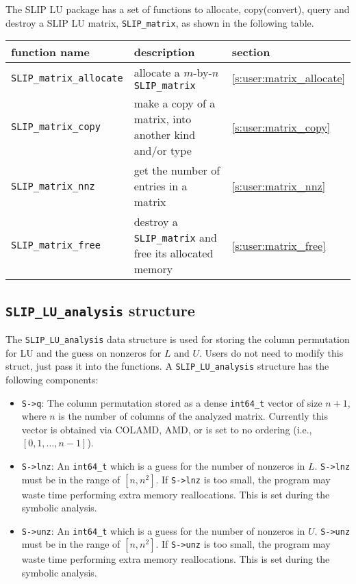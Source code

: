 \documentclass[12pt]{article}
\theoremstyle{definition}
\begin{document}
The SLIP LU package has a set of functions to allocate, copy(convert), query and
destroy a SLIP LU matrix, \verb|SLIP_matrix|, as shown in the following table.

{\small
\begin{center}
\begin{tabular}{lp{2.5in}l}
\hline
function name & description & section \\
\hline
\verb|SLIP_matrix_allocate|
    & allocate a $m$-by-$n$ \verb|SLIP_matrix|
    & \ref{s:user:matrix_allocate} \\
\hline
\verb|SLIP_matrix_copy|
    & make a copy of a matrix, into another kind and/or type
    & \ref{s:user:matrix_copy} \\
\hline
\verb|SLIP_matrix_nnz|
    & get the number of entries in a matrix
    & \ref{s:user:matrix_nnz} \\
\hline
\verb|SLIP_matrix_free|
    & destroy a \verb|SLIP_matrix| and free its allocated memory
    & \ref{s:user:matrix_free} \\
\hline
\end{tabular}
\end{center}
}


\cprotect\subsection{\verb|SLIP_LU_analysis| structure}
\label{ss:SLIP_LU_analysis}

The \verb|SLIP_LU_analysis| data structure is used for storing the column
permutation for LU and the guess on nonzeros for $L$ and $U$. Users do not need
to modify this struct, just pass it into the functions. A
\verb|SLIP_LU_analysis| structure has the following components:

\begin{itemize}
\item \verb|S->q|: The column permutation stored as a dense \verb|int64_t|
vector of size $n+1$, where $n$ is the number of columns of the analyzed matrix.
Currently this vector is obtained via COLAMD, AMD, or is set to no ordering
(i.e., $[0, 1, \hdots, n-1]$).

\item \verb|S->lnz|: An \verb|int64_t| which is a guess for the number of
nonzeros in $L$. \verb|S->lnz| must be in the range of $[n, n^2]$. If
\verb|S->lnz| is too small, the program may waste time performing extra memory
reallocations. This is set during the symbolic analysis.

\item \verb|S->unz|: An \verb|int64_t| which is a guess for the number of
nonzeros in $U$. \verb|S->unz| must be in the range of $[n, n^2]$. If
\verb|S->unz| is too small, the program may waste time performing extra memory
reallocations. This is set during the symbolic analysis.
\end{itemize}
\end{document}
